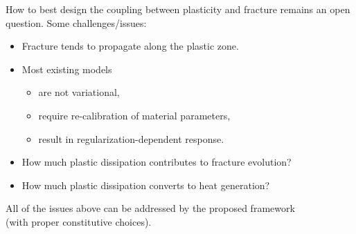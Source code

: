 \begin{frame}
\begin{columns}
\begin{column}{0.8\textwidth}
      How to best design the coupling between plasticity and fracture remains an open question. Some challenges/issues:
      \begin{itemize}
        \item Fracture tends to propagate along the plastic zone.
              \pause
        \item Most existing models
              \begin{itemize}
                \item are not variational,
                      \pause
                \item require re-calibration of material parameters,
                      \pause
                \item result in regularization-dependent response.
                      \pause
              \end{itemize}
        \item How much plastic dissipation contributes to fracture evolution?
              \pause
        \item How much plastic dissipation converts to heat generation?
      \end{itemize}
      
      \bigskip
      \pause
      
      \begin{block}{}
        \centering
        \vspace{1em}
        All of the issues above can be addressed by the proposed framework \\
        (with proper constitutive choices).
        \vspace{1em}
      \end{block}
    \end{column}
  \end{columns}
\end{frame}

